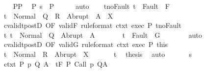 \begin{isabellebody}
\ \ \isamarkupfalse%
\ P{\isacharunderscore}P{\isacharprime}\ \isamarkupfalse%
\ P{\isacharprime}{\isacharcolon}\ {\isachardoublequoteopen}s\ {\isasymin}\ P{\isacharprime}{\isachardoublequoteclose}\isanewline
\ \ \ \ \isamarkupfalse%
\ auto\isanewline
\ \ \isamarkupfalse%
\ t{\isacharunderscore}noFault{\isacharcolon}\ {\isachardoublequoteopen}t\ {\isasymnotin}\ Fault\ {\isacharbackquote}\ F{\isachardoublequoteclose}\isanewline
\ \ \isamarkupfalse%
\ {\isachardoublequoteopen}t\ {\isasymin}\ Normal\ {\isacharbackquote}\ {\isacharparenleft}Q\ {\isasyminter}\ R{\isacharparenright}\ {\isasymunion}\ Abrupt\ {\isacharbackquote}\ {\isacharparenleft}A\ {\isasyminter}\ X{\isacharparenright}{\isachardoublequoteclose}\isanewline
\ \ \isamarkupfalse%
\ {\isacharminus}\isanewline
\ \ \ \ \isamarkupfalse%
\ cvalidt{\isacharunderscore}postD\ {\isacharbrackleft}OF\ validF\ {\isacharbrackleft}rule{\isacharunderscore}format{\isacharbrackright}\ ctxt\ exec\ P\ t{\isacharunderscore}noFault{\isacharbrackright}\isanewline
\ \ \ \ \isamarkupfalse%
\ t{\isacharcolon}\ {\isachardoublequoteopen}t\ {\isasymin}\ Normal\ {\isacharbackquote}\ Q\ {\isasymunion}\ Abrupt\ {\isacharbackquote}\ A{\isachardoublequoteclose}\isacommand{{\isachardot}}\isamarkupfalse%
\isanewline
\ \ \ \ \isamarkupfalse%
\ \isamarkupfalse%
\ {\isachardoublequoteopen}t\ {\isasymnotin}\ Fault\ {\isacharbackquote}\ G{\isachardoublequoteclose}\isanewline
\ \ \ \ \ \ \isamarkupfalse%
\ auto\isanewline
\ \ \ \ \isamarkupfalse%
\ cvalidt{\isacharunderscore}postD\ {\isacharbrackleft}OF\ validG\ {\isacharbrackleft}rule{\isacharunderscore}format{\isacharbrackright}\ ctxt{\isacharprime}\ exec\ P{\isacharprime}\ this{\isacharbrackright}\isanewline
\ \ \ \ \isamarkupfalse%
\ {\isachardoublequoteopen}t\ {\isasymin}\ Normal\ {\isacharbackquote}\ R\ {\isasymunion}\ Abrupt\ {\isacharbackquote}\ X{\isachardoublequoteclose}\ \isacommand{{\isachardot}}\isamarkupfalse%
\isanewline
\ \ \ \ \isamarkupfalse%
\ t\ \isamarkupfalse%
\ {\isacharquery}thesis\ \isamarkupfalse%
\ auto\isanewline
\ \ \isamarkupfalse%
\isanewline
{}\isamarkupfalse%
\isanewline
\ \ \isamarkupfalse%
\ s\isanewline
\ \ \isamarkupfalse%
\ ctxt{\isacharcolon}\ {\isachardoublequoteopen}{\isasymforall}{\isacharparenleft}P{\isacharcomma}\ p{\isacharcomma}\ Q{\isacharcomma}\ A{\isacharparenright}{\isasymin}{\isasymTheta}{\isachardot}\ {\isasymGamma}\ {\isasymTurnstile}\isactrlsub t\isactrlbsub {\isacharslash}F\isactrlesub \ P\ {\isacharparenleft}Call\ p{\isacharparenright}\ Q{\isacharcomma}A{\isachardoublequoteclose}\isanewline

\end{isabellebody}
